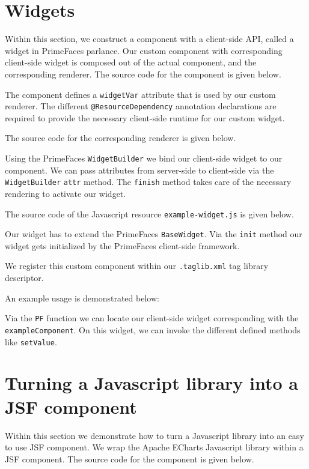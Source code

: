 \section{Widgets}
Within this section, we construct a component with a client-side API, called a widget in PrimeFaces parlance.
Our custom component with corresponding client-side widget is composed out of the actual component, and the corresponding renderer.
The source code for the component is given below.

The component defines a \texttt{widgetVar} attribute that is used by our custom renderer.
The different \texttt{@ResourceDependency} annotation declarations are required to provide the necessary client-side runtime for our custom widget.

The source code for the corresponding renderer is given below.

Using the PrimeFaces \texttt{WidgetBuilder} we bind our client-side widget to our component.
We can pass attributes from server-side to client-side via the \texttt{WidgetBuilder} \texttt{attr} method.
The \texttt{finish} method takes care of the necessary rendering to activate our widget.

The source code of the Javascript resource \texttt{example-widget.js} is given below.

Our widget has to extend the PrimeFaces \texttt{BaseWidget}.
Via the \texttt{init} method our widget gets initialized by the PrimeFaces client-side framework.

We register this custom component within our \texttt{.taglib.xml} tag library descriptor.


An example usage is demonstrated below:

Via the \texttt{PF} function we can locate our client-side widget corresponding with the \texttt{exampleComponent}.
On this widget, we can invoke the different defined methods like \texttt{setValue}.

\section{Turning a Javascript library into a JSF component}
Within this section we demonstrate how to turn a Javascript library into an easy to use JSF component.
We wrap the Apache ECharts \cite{ECharts} Javascript library within a JSF component.
The source code for the component is given below.


